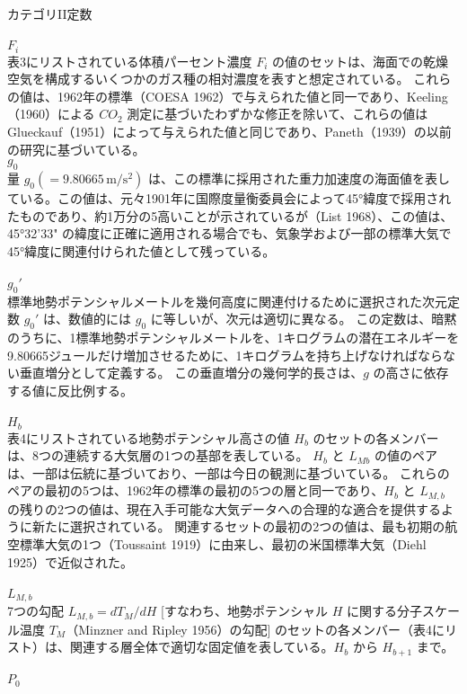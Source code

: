 \documentclass{article}
\begin{document}
カテゴリII定数\\
\\$F_i$\\
表3にリストされている体積パーセント濃度 $F_i$ の値のセットは、海面での乾燥空気を構成するいくつかのガス種の相対濃度を表すと想定されている。
これらの値は、1962年の標準（COESA 1962）で与えられた値と同一であり、Keeling（1960）による $CO_2$ 測定に基づいたわずかな修正を除いて、これらの値はGlueckauf（1951）によって与えられた値と同じであり、Paneth（1939）の以前の研究に基づいている。
\\$g_0$\\
量 $g_0 (= 9.80665 \, \mathrm{m/s^2})$ は、この標準に採用された重力加速度の海面値を表している。この値は、元々1901年に国際度量衡委員会によって45°緯度で採用されたものであり、約1万分の5高いことが示されているが（List 1968）、この値は、45°32'33" の緯度に正確に適用される場合でも、気象学および一部の標準大気で45°緯度に関連付けられた値として残っている。\\
\\$g_0\text{$'$}$\\
標準地勢ポテンシャルメートルを幾何高度に関連付けるために選択された次元定数 $g_0\text{$'$}$ は、数値的には $g_0$ に等しいが、次元は適切に異なる。
この定数は、暗黙のうちに、1標準地勢ポテンシャルメートルを、1キログラムの潜在エネルギーを9.80665ジュールだけ増加させるために、1キログラムを持ち上げなければならない垂直増分として定義する。
この垂直増分の幾何学的長さは、$g$ の高さに依存する値に反比例する。\\
\\$H_b$\\
表4にリストされている地勢ポテンシャル高さの値 $H_b$ のセットの各メンバーは、8つの連続する大気層の1つの基部を表している。
$H_b$ と $L_{Mb}$ の値のペアは、一部は伝統に基づいており、一部は今日の観測に基づいている。
これらのペアの最初の5つは、1962年の標準の最初の5つの層と同一であり、$H_b$ と $L_{M,b}$ の残りの2つの値は、現在入手可能な大気データへの合理的な適合を提供するように新たに選択されている。
関連するセットの最初の2つの値は、最も初期の航空標準大気の1つ（Toussaint 1919）に由来し、最初の米国標準大気（Diehl 1925）で近似された。\\
\\$L_{M,b}$\\
7つの勾配 $L_{M,b} = dT_M/dH$ [すなわち、地勢ポテンシャル $H$ に関する分子スケール温度 $T_M$（Minzner and Ripley 1956）の勾配] のセットの各メンバー（表4にリスト）は、関連する層全体で適切な固定値を表している。$H_b$ から $H_{b+1}$ まで。\\
\\$P_0$\\
\end{document}
